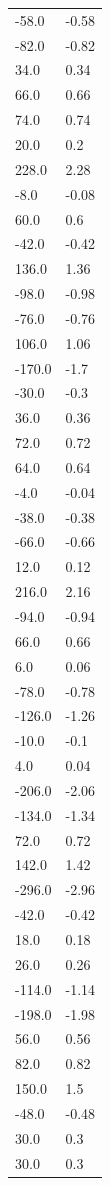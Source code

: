\begin{longtable}{ll}
-58.0 & -0.58 \\
-82.0 & -0.82 \\
34.0 & 0.34 \\
66.0 & 0.66 \\
74.0 & 0.74 \\
20.0 & 0.2 \\
228.0 & 2.28 \\
-8.0 & -0.08 \\
60.0 & 0.6 \\
-42.0 & -0.42 \\
136.0 & 1.36 \\
-98.0 & -0.98 \\
-76.0 & -0.76 \\
106.0 & 1.06 \\
-170.0 & -1.7 \\
-30.0 & -0.3 \\
36.0 & 0.36 \\
72.0 & 0.72 \\
64.0 & 0.64 \\
-4.0 & -0.04 \\
-38.0 & -0.38 \\
-66.0 & -0.66 \\
12.0 & 0.12 \\
216.0 & 2.16 \\
-94.0 & -0.94 \\
66.0 & 0.66 \\
6.0 & 0.06 \\
-78.0 & -0.78 \\
-126.0 & -1.26 \\
-10.0 & -0.1 \\
4.0 & 0.04 \\
-206.0 & -2.06 \\
-134.0 & -1.34 \\
72.0 & 0.72 \\
142.0 & 1.42 \\
-296.0 & -2.96 \\
-42.0 & -0.42 \\
18.0 & 0.18 \\
26.0 & 0.26 \\
-114.0 & -1.14 \\
-198.0 & -1.98 \\
56.0 & 0.56 \\
82.0 & 0.82 \\
150.0 & 1.5 \\
-48.0 & -0.48 \\
30.0 & 0.3 \\
30.0 & 0.3 \\

\end{longtable}
